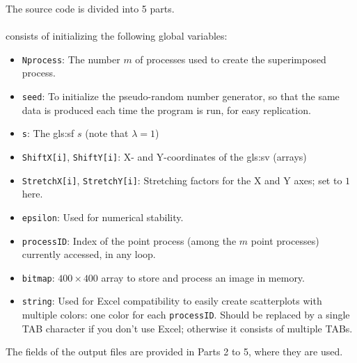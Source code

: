 \documentclass[10pt]{article}
\begin{document}
\noindent The source code is divided into 5 parts.  \\
\quad \\
 consists of initializing the following global variables:
\begin{itemize}
\item \texttt{Nprocess}: The number $m$ of processes used to create the superimposed process.
\item \texttt{seed}: To initialize the pseudo-random number generator, so that the same data is produced each time the program is run, for easy replication.
\item \texttt{s}: The \gls{gls:sf} $s$ (note that $\lambda = 1$)
\item \texttt{ShiftX[i]}, \texttt{ShiftY[i]}: X- and Y-coordinates of the \gls{gls:sv} (arrays)
\item \texttt{StretchX[i]}, \texttt{StretchY[i]}:  \textcolor{index}{Stretching factors} for the X and Y axes; set to $1$ here.
\item \texttt{epsilon}: Used for numerical stability.
\item \texttt{processID}: Index of the point process (among the $m$ point processes) currently accessed, in any loop.
\item \texttt{bitmap}: $400 \times 400$ array to store and process an image in memory.
\item \texttt{string}: Used for Excel compatibility to easily create scatterplots with multiple colors: one color for each \texttt{processID}. Should be replaced
by a single TAB character if you don't use Excel; otherwise it consists of multiple TABs.
\end{itemize}
\noindent The fields of the output files are provided in Parts 2 to 5, where they are used.
\end{document}
